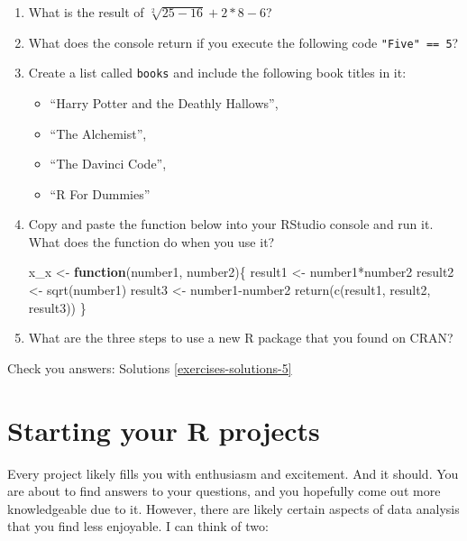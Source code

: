 \documentclass[
]{book}
\newenvironment{Shaded}{\begin{snugshade}}{\end{snugshade}}
\newcommand{\ControlFlowTok}[1]{\textcolor[rgb]{0.13,0.29,0.53}{\textbf{#1}}}
\newcommand{\FunctionTok}[1]{\textcolor[rgb]{0.00,0.00,0.00}{#1}}
\newcommand{\NormalTok}[1]{#1}
\newcommand{\OtherTok}[1]{\textcolor[rgb]{0.56,0.35,0.01}{#1}}
\newcommand{\SpecialCharTok}[1]{\textcolor[rgb]{0.00,0.00,0.00}{#1}}
\begin{document}
\begin{enumerate}
\def\labelenumi{\arabic{enumi}.}
\item
  What is the result of \(\sqrt[2]{25-16}+2*8-6\)?
\item
  What does the console return if you execute the following code \texttt{"Five"\ ==\ 5}?
\item
  Create a list called \texttt{books} and include the following book titles in it:

  \begin{itemize}
  \item
    ``Harry Potter and the Deathly Hallows'',
  \item
    ``The Alchemist'',
  \item
    ``The Davinci Code'',
  \item
    ``R For Dummies''
  \end{itemize}
\item
  Copy and paste the function below into your RStudio console and run it. What does the function do when you use it?

\begin{Shaded}
\begin{Highlighting}[]
\NormalTok{x\_x }\OtherTok{\textless{}{-}} \ControlFlowTok{function}\NormalTok{(number1, number2)\{}
\NormalTok{  result1 }\OtherTok{\textless{}{-}}\NormalTok{ number1}\SpecialCharTok{*}\NormalTok{number2}
\NormalTok{  result2 }\OtherTok{\textless{}{-}} \FunctionTok{sqrt}\NormalTok{(number1)}
\NormalTok{  result3 }\OtherTok{\textless{}{-}}\NormalTok{ number1}\SpecialCharTok{{-}}\NormalTok{number2}
  \FunctionTok{return}\NormalTok{(}\FunctionTok{c}\NormalTok{(result1, result2, result3))}
\NormalTok{\} }
\end{Highlighting}
\end{Shaded}
\item
  What are the three steps to use a new R package that you found on CRAN?
\end{enumerate}

Check you answers: Solutions \ref{exercises-solutions-5}

\hypertarget{starting-your-r-projects}{%
\chapter{Starting your R projects}\label{starting-your-r-projects}}

Every project likely fills you with enthusiasm and excitement. And it should. You are about to find answers to your questions, and you hopefully come out more knowledgeable due to it. However, there are likely certain aspects of data analysis that you find less enjoyable. I can think of two:
\end{document}
